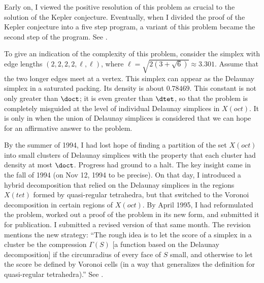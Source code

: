 Early on, I viewed the positive resolution of this problem as
crucial to the solution of the Kepler conjecture.  Eventually,
when I divided the proof of the Kepler conjecture into a five step
program, a variant of this problem became the second step of the
program. See \cite{part2}.

To give an indication of the complexity of this problem, consider
the simplex with edge lengths $(2,2,2,2,\ell,\ell)$, where $\ell =
\sqrt{2 (3 + \sqrt6)}\approx 3.301$.  Assume that the two longer
edges meet at a vertex.  This simplex can appear as the Delaunay
simplex in a saturated packing.  Its density is about $0.78469$.
This constant is not only greater than $\doct$; it is even greater
than $\dtet$, so that the problem is completely misguided at the
level of individual Delaunay simplices in $X(oct)$.  It is only in
when the union of Delaunay simplices is considered that we can
hope for an affirmative answer to the problem.

By the summer of 1994, I had lost hope of finding a partition of
the set $X(oct)$ into small clusters of Delaunay simplices with
the property that each cluster had density at most $\doct$.
Progress had ground to a halt.   The key insight came in the fall
of 1994 (on Nov 12, 1994 to be precise). On that day, I introduced
a hybrid decomposition that relied on the Delaunay simplices in
the regions $X(tet)$ formed by quasi-regular tetrahedra, but that
switched to the Voronoi decomposition in certain regions of
$X(oct)$. By April 1995, I had reformulated the problem, worked
out a proof of the problem \cite{part2} in its new form, and
submitted it for publication. I submitted a revised version of
\cite{part1} that same month.  The revision mentions the new
strategy: ``The rough idea is to let the score of a simplex in a
cluster be the compression $\Gamma(S)$ [a function based on the
Delaunay decomposition] if the circumradius of every face of $S$
small, and otherwise to let the score be defined by Voronoi cells
(in a way that generalizes the definition for quasi-regular
tetrahedra).'' See \cite[p.6]{part1}.

